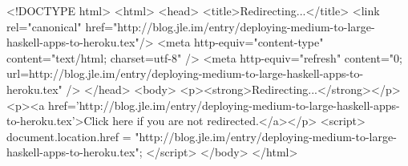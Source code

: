 <!DOCTYPE html>
<html>
<head>
<title>Redirecting...</title>
<link rel="canonical" href="http://blog.jle.im/entry/deploying-medium-to-large-haskell-apps-to-heroku.tex"/>
<meta http-equiv="content-type" content="text/html; charset=utf-8" />
<meta http-equiv="refresh" content="0; url=http://blog.jle.im/entry/deploying-medium-to-large-haskell-apps-to-heroku.tex" />
</head>
<body>
  <p><strong>Redirecting...</strong></p>
  <p><a href='http://blog.jle.im/entry/deploying-medium-to-large-haskell-apps-to-heroku.tex'>Click here if you are not redirected.</a></p>
  <script>
    document.location.href = "http://blog.jle.im/entry/deploying-medium-to-large-haskell-apps-to-heroku.tex";
  </script>
</body>
</html>

